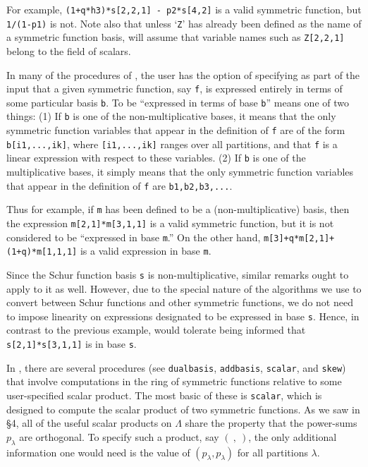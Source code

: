 For example, {\tt (1+q*h3)*s[2,2,1] - p2*s[4,2]} is a valid
symmetric function, but {\tt 1/(1-p1)} is not. Note also that unless
`{\tt Z}' has already been defined as the name of a symmetric function
basis, \SF{} will assume that variable names such as {\tt Z[2,2,1]}
belong to the field of scalars.

In many of the procedures of \SF{}, the user has the option of specifying
as part of the input that a given symmetric function, say {\tt f}, is
expressed entirely in terms of some particular basis {\tt b}. To be
``expressed in terms of base {\tt b}'' means one of two things:
(1) If {\tt b} is one of the non-multiplicative bases,
it means that the only symmetric function variables that appear in the
definition of {\tt f} are of the form {\tt b[i\ul{}1,...,i\ul{}k]},
where {\tt [i\ul{}1,...,i\ul{}k]} ranges over all partitions,
and that {\tt f} is a linear expression with respect to these variables.
(2) If {\tt b} is one of the multiplicative bases, it simply means that
the only symmetric function variables that appear in the definition
of {\tt f} are {\tt b1,b2,b3,...}.

Thus for example, if {\tt m} has been defined to be a (non-multiplicative)
basis, then the expression {\tt m[2,1]*m[3,1,1]} is a valid symmetric
function, but it is not considered to be ``expressed in base {\tt m}.''
On the other hand, {\tt m[3]+q*m[2,1]+(1+q)*m[1,1,1]} is a valid
expression in base {\tt m}.

Since the Schur function basis {\tt s} is non-multiplicative, similar
remarks ought to apply to it as well. However, due to the special nature
of the algorithms we use to convert between Schur functions and other
symmetric functions, we do not need to impose linearity on expressions
designated to be expressed in base {\tt s}. Hence, in contrast to the
previous example, \SF{} would tolerate being informed
that {\tt s[2,1]*s[3,1,1]} is in base {\tt s}.

In \SF, there are several procedures (see {\tt dual\ul{}basis},
{\tt add\ul{}basis}, {\tt scalar}, and {\tt skew}) that involve
computations in the ring of symmetric functions relative to some
user-specified scalar product. The most basic of these is {\tt scalar},
which is designed to compute the scalar product of two symmetric
functions. As we saw in \S4, all of the useful scalar products
on $\Lambda$ share the property that the power-sums $p_\lambda$ are
orthogonal. To specify such a product, say $(\ {,}\ )$, the only
additional information one would need is the value
of $(p_\lambda,p_\lambda)$ for all partitions $\lambda$.

